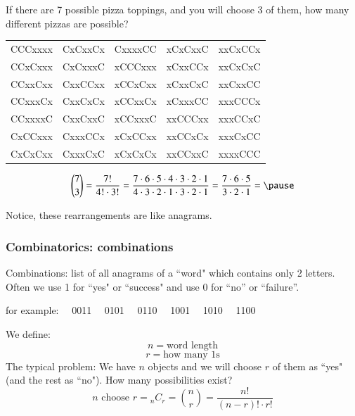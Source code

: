 \begin{frame}
If there are 7 possible pizza toppings, and you will choose 3 of them, how many different pizzas are possible?
\pause
\begin{center}
\begin{tabular}{c c c c c}
CCCxxxx  & CxCxxCx  & CxxxxCC  & xCxCxxC  & xxCxCCx  \\
CCxCxxx  & CxCxxxC  & xCCCxxx  & xCxxCCx  & xxCxCxC  \\
CCxxCxx  & CxxCCxx  & xCCxCxx  & xCxxCxC  & xxCxxCC  \\
CCxxxCx  & CxxCxCx  & xCCxxCx  & xCxxxCC  & xxxCCCx  \\
CCxxxxC  & CxxCxxC  & xCCxxxC  & xxCCCxx  & xxxCCxC  \\
CxCCxxx  & CxxxCCx  & xCxCCxx  & xxCCxCx  & xxxCxCC  \\
CxCxCxx  & CxxxCxC  & xCxCxCx  & xxCCxxC  & xxxxCCC  
\end{tabular}
\end{center}
\pause
$${7\choose 3} = \frac{7!}{4! \cdot 3!} = \frac{7 \cdot 6 \cdot 5\cdot 4\cdot 3\cdot 2\cdot 1}{4\cdot 3\cdot 2\cdot 1\cdot 3\cdot 2\cdot 1} = \frac{7\cdot 6\cdot 5}{3\cdot2\cdot 1} = \pause \soln{\fbox{35}}$$

\pause
Notice, these rearrangements are like anagrams.

\end{frame} 




\begin{frame}
\frametitle{Combinatorics: combinations}
Combinations: list of all anagrams of a ``word" which contains only 2 letters. Often we use 1 for ``yes" or ``success" and use 0 for ``no'' or ``failure''.

\pause
for example: ~~0011 ~~0101 ~~0110 ~~1001 ~~1010 ~~1100

\vspace{10pt}
\pause
We define:
$$n = \text{word length}$$
$$r = \text{how many 1s}$$
The typical problem: We have $n$ objects and we will choose $r$ of them as ``yes"  (and the rest as ``no"). How many possibilities exist?
$$n\text{ choose } r = {}_nC_r = {n \choose r} = \frac{n!}{(n-r)! \cdot r!} $$
\end{frame}


